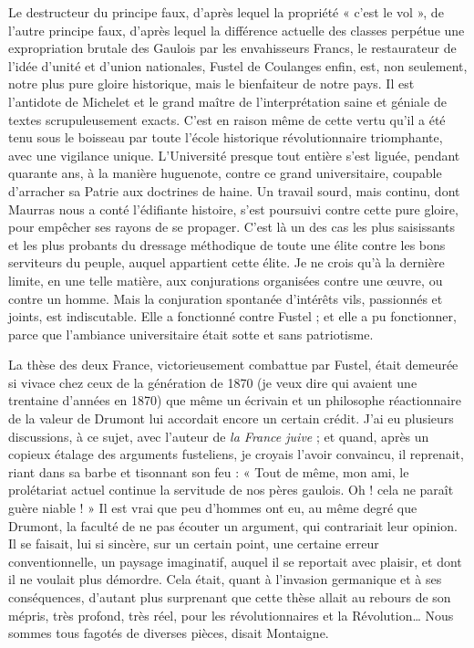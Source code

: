 \documentclass[french,twoside]{book} %
\begin{document}
Le destructeur du principe faux, d’après lequel la propriété « c’est le vol », de l’autre principe faux, d’après lequel la différence actuelle des classes perpétue une expropriation brutale des Gaulois par les envahisseurs Francs, le restaurateur de l’idée d’unité et d’union nationales, Fustel de Coulanges enfin, est, non seulement, notre plus pure gloire historique, mais le bienfaiteur de notre pays. Il est l’antidote de Michelet et le grand maître de l’interprétation saine et géniale de textes scrupuleusement exacts. C’est en raison même de cette vertu qu’il a été tenu sous le boisseau par toute l’école historique révolutionnaire triomphante, avec une vigilance unique. L’Université presque tout entière s’est liguée, pendant quarante ans, à la manière huguenote, contre ce grand universitaire, coupable d’arracher sa Patrie aux doctrines de haine. Un travail sourd, mais continu, dont Maurras nous a conté l’édifiante histoire, s’est poursuivi contre cette pure gloire, pour empêcher ses rayons de se propager. C’est là un des cas les plus saisissants et les plus probants du dressage méthodique de toute une élite contre les bons serviteurs du peuple, auquel appartient cette élite. Je ne crois qu’à la dernière limite, en une telle matière, aux conjurations organisées contre une œuvre, ou contre un homme. Mais la conjuration spontanée d’intérêts vils, passionnés et joints, est indiscutable. Elle a fonctionné contre Fustel ; et elle a pu fonctionner, parce que l’ambiance universitaire était sotte et sans patriotisme.\par
La thèse des deux France, victorieusement combattue par Fustel, était demeurée si vivace chez ceux de la génération de 1870 (je veux dire qui avaient une trentaine d’années en 1870) que même un écrivain et un philosophe réactionnaire de la valeur de Drumont lui accordait encore un certain crédit. J’ai eu plusieurs discussions, à ce sujet, avec l’auteur de {\itshape la France juive} ; et quand, après un copieux étalage des arguments fusteliens, je croyais l’avoir convaincu, il reprenait, riant dans sa barbe et tisonnant son feu : « Tout de même, mon ami, le prolétariat actuel continue la servitude de nos pères gaulois. Oh ! cela ne paraît guère niable ! » Il est vrai que peu d’hommes ont eu, au même degré que Drumont, la faculté de ne pas écouter un argument, qui contrariait leur opinion. Il se faisait, lui si sincère, sur un certain point, une certaine erreur conventionnelle, un paysage imaginatif, auquel il se reportait avec plaisir, et dont il ne voulait plus démordre. Cela était, quant à l’invasion germanique et à ses conséquences, d’autant plus surprenant que cette thèse allait au rebours de son mépris, très profond, très réel, pour les révolutionnaires et la Révolution… Nous sommes tous fagotés de diverses pièces, disait Montaigne.\par
\end{document}
